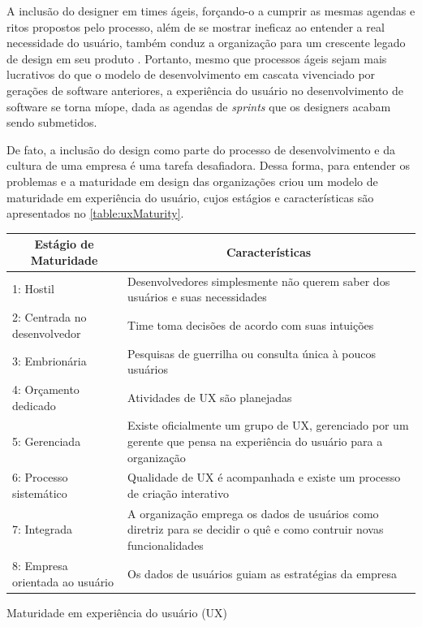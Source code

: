 A inclusão do designer em times ágeis, forçando-o a cumprir as mesmas agendas e ritos propostos pelo processo, além de se mostrar ineficaz ao entender a real necessidade do usuário, também conduz a organização para um crescente legado de design em seu produto \cite{ruissalo2018operating}. Portanto, mesmo que processos ágeis sejam mais lucrativos do que o modelo de desenvolvimento em cascata vivenciado por gerações de software anteriores, a experiência do usuário no desenvolvimento de software se torna míope, dada as agendas de \textit{sprints} que os designers acabam sendo submetidos.

De fato, a inclusão do design como parte do processo de desenvolvimento e da cultura de uma empresa é uma tarefa desafiadora. Dessa forma, para entender os problemas e a maturidade em design das organizações  criou um modelo de maturidade em experiência do usuário, cujos estágios e características são apresentados no \autoref{table:uxMaturity}.

\begin{quadro}[!htb]
\centering
\begin{tabular}{|m{5cm}|m{9cm}|} \hline
	
	\multicolumn{1}{|c|}{\bfseries Estágio de Maturidade} & \multicolumn{1}{c|}{\bfseries Características} \\\hline
	
	 1: Hostil & Desenvolvedores simplesmente não querem saber dos usuários e suas necessidades \\\hline
	 
	 2: Centrada no desenvolvedor & Time toma decisões de acordo com suas intuições \\\hline
	 
	 3: Embrionária & Pesquisas de guerrilha ou consulta única à poucos usuários \\\hline
	 
	 4: Orçamento dedicado & Atividades de UX são planejadas \\\hline
	 
	 5: Gerenciada & Existe oficialmente um grupo de UX, gerenciado por um gerente que pensa na experiência do usuário para a organização \\\hline
	 
	 6: Processo sistemático & Qualidade de UX é acompanhada e existe um processo de criação interativo \\\hline
	 
	 7: Integrada & A organização emprega os dados de usuários como diretriz para se decidir o quê e como contruir novas funcionalidades \\\hline
	 
	 8: Empresa orientada ao usuário & Os dados de usuários guiam as estratégias da empresa \\\hline
    
\end{tabular}
\caption{Maturidade em experiência do usuário (UX)}
\label{table:uxMaturity}
\end{quadro}

